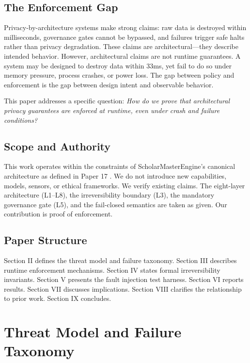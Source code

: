 \documentclass[conference]{IEEEtran}
\begin{document}
\subsection{The Enforcement Gap}
Privacy-by-architecture systems make strong claims: raw data is destroyed within milliseconds, governance gates cannot be bypassed, and failures trigger safe halts rather than privacy degradation. These claims are architectural—they describe intended behavior. However, architectural claims are not runtime guarantees. A system may be designed to destroy data within 33ms, yet fail to do so under memory pressure, process crashes, or power loss. The gap between policy and enforcement is the gap between design intent and observable behavior.

This paper addresses a specific question: \textit{How do we prove that architectural privacy guarantees are enforced at runtime, even under crash and failure conditions?}

\subsection{Scope and Authority}
This work operates within the constraints of ScholarMasterEngine's canonical architecture as defined in Paper 17 \cite{b17}. We do not introduce new capabilities, models, sensors, or ethical frameworks. We verify existing claims. The eight-layer architecture (L1–L8), the irreversibility boundary (L3), the mandatory governance gate (L5), and the fail-closed semantics are taken as given. Our contribution is proof of enforcement.

\subsection{Paper Structure}
Section II defines the threat model and failure taxonomy. Section III describes runtime enforcement mechanisms. Section IV states formal irreversibility invariants. Section V presents the fault injection test harness. Section VI reports results. Section VII discusses implications. Section VIII clarifies the relationship to prior work. Section IX concludes.

\section{Threat Model and Failure Taxonomy}
\end{document}
